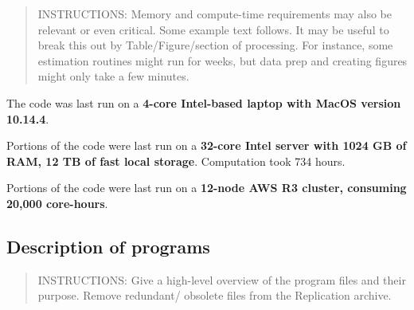 \documentclass[
]{article}
\begin{document}
\begin{quote}
INSTRUCTIONS: Memory and compute-time requirements may also be relevant
or even critical. Some example text follows. It may be useful to break
this out by Table/Figure/section of processing. For instance, some
estimation routines might run for weeks, but data prep and creating
figures might only take a few minutes.
\end{quote}

The code was last run on a \textbf{4-core Intel-based laptop with MacOS
version 10.14.4}.

Portions of the code were last run on a \textbf{32-core Intel server
with 1024 GB of RAM, 12 TB of fast local storage}. Computation took 734
hours.

Portions of the code were last run on a \textbf{12-node AWS R3 cluster,
consuming 20,000 core-hours}.

\hypertarget{description-of-programs}{%
\subsection{Description of programs}\label{description-of-programs}}

\begin{quote}
INSTRUCTIONS: Give a high-level overview of the program files and their
purpose. Remove redundant/ obsolete files from the Replication archive.
\end{quote}
\end{document}
